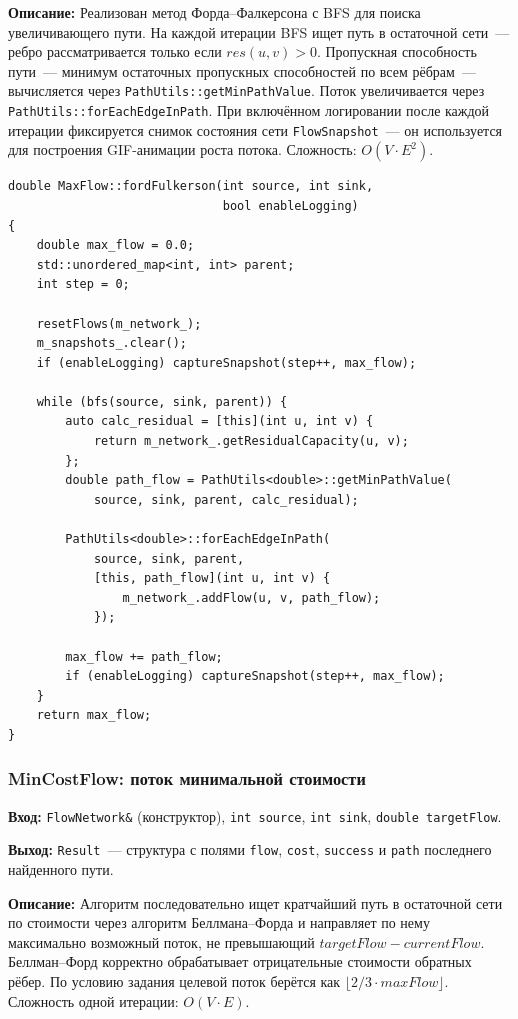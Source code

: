 \textbf{Описание:} Реализован метод Форда--Фалкерсона с BFS
для поиска увеличивающего пути.
На каждой итерации BFS ищет путь в остаточной сети~---
ребро рассматривается только если
$\mathit{res}(u,v) > 0$. Пропускная способность пути~---
минимум остаточных пропускных способностей по всем рёбрам~---
вычисляется через \texttt{PathUtils::getMinPathValue}.
Поток увеличивается через \texttt{PathUtils::forEachEdgeInPath}.
При включённом логировании после каждой итерации фиксируется
снимок состояния сети \texttt{FlowSnapshot}~--- он используется
для построения GIF-анимации роста потока.
Сложность: $O(V \cdot E^2)$.

\begin{lstlisting}[style=cppstyle, caption={Алгоритм Форда--Фалкерсона (MaxFlow.cc)}]
double MaxFlow::fordFulkerson(int source, int sink,
                              bool enableLogging)
{
    double max_flow = 0.0;
    std::unordered_map<int, int> parent;
    int step = 0;

    resetFlows(m_network_);
    m_snapshots_.clear();
    if (enableLogging) captureSnapshot(step++, max_flow);

    while (bfs(source, sink, parent)) {
        auto calc_residual = [this](int u, int v) {
            return m_network_.getResidualCapacity(u, v);
        };
        double path_flow = PathUtils<double>::getMinPathValue(
            source, sink, parent, calc_residual);

        PathUtils<double>::forEachEdgeInPath(
            source, sink, parent,
            [this, path_flow](int u, int v) {
                m_network_.addFlow(u, v, path_flow);
            });

        max_flow += path_flow;
        if (enableLogging) captureSnapshot(step++, max_flow);
    }
    return max_flow;
}
\end{lstlisting}

\subsubsection{MinCostFlow: поток минимальной стоимости}

\textbf{Вход:} \texttt{FlowNetwork\&} (конструктор), \texttt{int source},
\texttt{int sink}, \texttt{double targetFlow}.

\textbf{Выход:} \texttt{Result}~--- структура с полями \texttt{flow},
\texttt{cost}, \texttt{success} и \texttt{path} последнего найденного пути.

\textbf{Описание:} Алгоритм последовательно ищет кратчайший путь
в остаточной сети по стоимости через алгоритм Беллмана--Форда
и направляет по нему максимально возможный поток, не превышающий
$\mathit{targetFlow} - \mathit{currentFlow}$. Беллман--Форд
корректно обрабатывает отрицательные стоимости обратных рёбер.
По условию задания целевой поток берётся как $\lfloor 2/3 \cdot
\mathit{maxFlow} \rfloor$. Сложность одной итерации: $O(V \cdot E)$.

